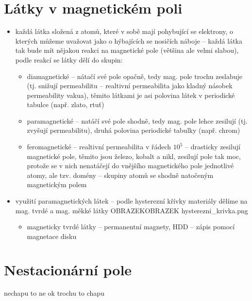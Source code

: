 \documentclass{article}
\begin{document}
\section{Látky v magnetickém poli}
\begin{itemize}
  \item každá látka složená z atomů, které v sobě mají pohybující se elektrony, o kterých můžeme uvažovat jako o hýbajících se nosičích náboje -- každá látka tak bude mít nějakou reakci na magnetické pole (většina ale velmi slabou), podle reakcí se látky dělí do skupin:
  \begin{itemize}
    \item diamagnetické -- nátačí své pole opačně, tedy mag. pole trochu zeslabuje (tj. snižují permeabilitu -- realtivní permeabilita jako kladný násobek permeability vakua), těmito látkami je asi polovina látek v periodické tabulce (např. zlato, rtuť)
    \item paramagnetické -- natáčí své pole shodně, tedy mag. pole lehce zesilují (tj. zvyšují permeabilitu), druhá polovina periodické tabulky (např. chrom)
    \item feromagnetické -- realtivní permeabilita v řádech $10^5$ -- drasticky zesilují magnetické pole, těmito jsou železo, kobalt a nikl, zesilují pole tak moc, protože se v nich nenatáčejí do vnějšího magnetického pole jednotlivé atomy, ale tzv. domény -- skupiny atomů se shodně natočeným magnetickým polem
  \end{itemize}
  \item využití paramagnetických látek -- podle hysterezní křívky materiály dělíme na mag. tvrdé a mag. měkké látky OBRAZEKOBRAZEK hysterezni\_krivka.png
  \begin{itemize}
    \item magneticky tvrdé látky -- permanentní magnety, HDD -- zápis pomocí magnetace disku
  \end{itemize}
\end{itemize}

\section{Nestacionární pole}
nechapu to ne ok trochu to chapu
\end{document}
